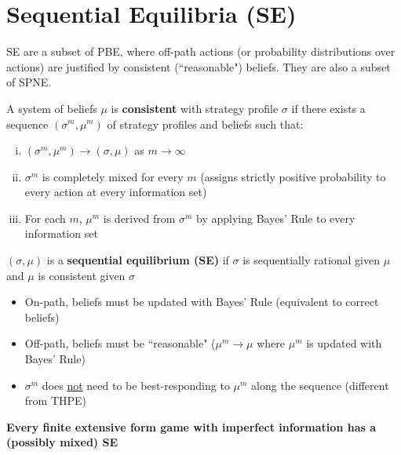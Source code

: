 \documentclass{report}
\begin{document}
\section*{Sequential Equilibria (SE)}\medskip

SE are a subset of PBE, where off-path actions (or probability distributions over actions) are justified by consistent (``reasonable") beliefs. They are also a subset of SPNE. \bigskip


\bigskip

A system of beliefs $\mu$ is \textbf{consistent} with strategy profile $\sigma$ if there exists a sequence $(\sigma^m,\mu^m)$ of strategy profiles and beliefs such that:
\begin{enumerate}[(i)]
	\item $(\sigma^m,\mu^m) \rightarrow (\sigma,\mu)$ as $m\rightarrow \infty$
	\item $\sigma^m$ is completely mixed for every $m$ (assigns strictly positive probability to every action at every information set)
	\item For each $m$, $\mu^m$ is derived from $\sigma^m$ by applying Bayes' Rule to every information set
\end{enumerate} \bigskip

$(\sigma,\mu)$ is a \textbf{sequential equilibrium (SE)} if $\sigma$ is sequentially rational given $\mu$ and $\mu$ is consistent given $\sigma$
\begin{itemize}
	\item On-path, beliefs must be updated with Bayes' Rule (equivalent to correct beliefs)
	\item Off-path, beliefs must be ``reasonable" ($\mu^m \rightarrow \mu$ where $\mu^m$ is updated with Bayes' Rule)
	\item $\sigma^m$ does \underline{not} need to be best-responding to $\mu^m$ along the sequence (different from THPE)
\end{itemize} \bigskip \bigskip

\textbf{Every finite extensive form game with imperfect information has a (possibly mixed) SE}
\end{document}

